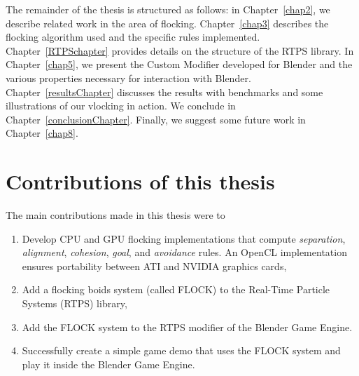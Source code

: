 
The remainder of the thesis is structured as follows:  in Chapter~\ref{chap2}, we describe related work in the area of flocking. Chapter~\ref{chap3} describes the flocking algorithm used and the specific rules implemented. Chapter~\ref{RTPSchapter} provides details on the structure of the RTPS library. In Chapter~\ref{chap5}, we present the Custom Modifier developed for Blender and the various properties necessary for interaction with Blender. Chapter~\ref{resultsChapter} discusses the results with benchmarks and some illustrations of our vlocking in action. We conclude in Chapter~\ref{conclusionChapter}.  Finally, we suggest some future work in Chapter~\ref{chap8}. 

\section{Contributions of this thesis}
The main contributions made in this thesis were to
\begin{enumerate}
\item Develop CPU and GPU flocking implementations that compute \textit{separation}, \textit{alignment}, \textit{cohesion}, \textit{goal}, and \textit{avoidance} rules. An OpenCL implementation ensures portability between ATI and NVIDIA graphics cards,
\item Add a flocking boids system (called FLOCK) to the Real-Time Particle Systems (RTPS) library,
\item Add the FLOCK system to the RTPS modifier of the Blender Game Engine.
\item Successfully create a simple game demo that uses the FLOCK system and play it inside the Blender Game Engine.
\end{enumerate}
